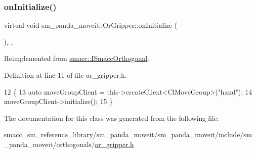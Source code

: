 \subsubsection{\texorpdfstring{on\+Initialize()}{onInitialize()}}
{\footnotesize\ttfamily virtual void sm\+\_\+panda\+\_\+moveit\+::\+Or\+Gripper\+::on\+Initialize (\begin{DoxyParamCaption}{ }\end{DoxyParamCaption})\hspace{0.3cm}{\ttfamily [inline]}, {\ttfamily [override]}, {\ttfamily [virtual]}}



Reimplemented from \hyperlink{classsmacc_1_1ISmaccOrthogonal_a6bb31c620cb64dd7b8417f8705c79c7a}{smacc\+::\+I\+Smacc\+Orthogonal}.



Definition at line 11 of file or\+\_\+gripper.\+h.


\begin{DoxyCode}
12     \{
13         \textcolor{keyword}{auto} moveGroupClient = this->createClient<ClMoveGroup>(\textcolor{stringliteral}{"hand"});
14         moveGroupClient->initialize();
15     \}
\end{DoxyCode}


The documentation for this class was generated from the following file\+:\begin{DoxyCompactItemize}
\item 
smacc\+\_\+sm\+\_\+reference\+\_\+library/sm\+\_\+panda\+\_\+moveit/sm\+\_\+panda\+\_\+moveit/include/sm\+\_\+panda\+\_\+moveit/orthogonals/\hyperlink{sm__panda__moveit_2sm__panda__moveit_2include_2sm__panda__moveit_2orthogonals_2or__gripper_8h}{or\+\_\+gripper.\+h}\end{DoxyCompactItemize}
